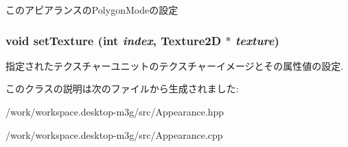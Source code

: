 このアピアランスのPolygonModeの設定 \hypertarget{classm3g_1_1Appearance_493e54b1c7ab839b9e76b28e0629cf6a}{
\subsubsection[{setTexture}]{\setlength{\rightskip}{0pt plus 5cm}void setTexture (int {\em index}, \/  {\bf Texture2D} $\ast$ {\em texture})}}
\label{classm3g_1_1Appearance_493e54b1c7ab839b9e76b28e0629cf6a}


指定されたテクスチャーユニットのテクスチャーイメージとその属性値の設定. 

このクラスの説明は次のファイルから生成されました:\begin{CompactItemize}
\item 
/work/workspace.desktop-m3g/src/Appearance.hpp\item 
/work/workspace.desktop-m3g/src/Appearance.cpp\end{CompactItemize}
